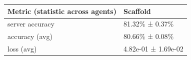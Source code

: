 \begin{tabular}{ll}
\hline
 Metric (statistic across agents)   & Scaffold            \\
\hline
 server accuracy                    & 81.32\% ± 0.37\%      \\
 accuracy (avg)                     & 80.66\% ± 0.08\%      \\
 loss (avg)                         & 4.82e-01 ± 1.69e-02 \\
\hline
\end{tabular}